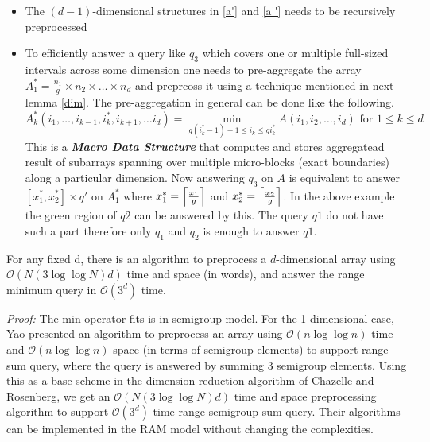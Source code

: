 \begin{itemize}
\item The $(d-1)$-dimensional structures in \eqref{a'} and \eqref{a''} needs to be recursively preprocessed
\item To efficiently answer a query like $q_3$ which covers one or multiple full-sized intervals across some dimension one needs to pre-aggregate the array $A^*_1=\frac{n_1}{g}\times n_2\times\ldots\times n_d$ and preprcoss it using a technique mentioned in next lemma \ref{dim}. The pre-aggregation in general can be done like the following.
\[A^*_k(i_1,\dots,i_{k-1},i^*_k,i_{k+1},\ldots i_d)=\min_{g(i^*_k-1)+1\leq i_k\leq gi^*_k}A(i_1,i_2,\dots,i_d) \text{ for } 1\leq k\leq d\]
This is a \emph{\bf Macro Data Structure} that computes and stores aggregatead result of subarrays spanning over multiple micro-blocks (exact boundaries) along a particular dimension. Now answering $q_3$ on $A$ is equivalent to answer $[x^*_1,x^*_2]\times q'$ on $A^*_1$ where $x^*_1=\ceil*{\frac{x_1}{g}}$ and $x^*_2=\ceil*{\frac{x_2}{g}}$. In the above example the green region of $q2$ can be answered by this. The query $q1$ do not have such a part therefore only $q_1$ and $q_2$ is enough to answer $q1$.
\end{itemize}
\begin{lemma}
\label{dim}
For any fixed d, there is an algorithm to preprocess a $d$-dimensional array using $\mathcal{O}(N(3\log\log N)d)$ time and space (in words), and answer the range minimum query in $\mathcal{O}(3^d)$ time.
\end{lemma}
\emph{Proof:} The min operator fits is in semigroup model. For the 1-dimensional case, Yao \cite{p17} presented an algorithm to preprocess an array using $\mathcal{O}(n\log\log n)$ time and $\mathcal{O}(n\log\log n)$ space (in terms of semigroup elements) to support range sum query, where the query is answered by summing $3$ semigroup elements. Using this as a base scheme in the dimension reduction algorithm of Chazelle and Rosenberg\cite{p3}, we get an $\mathcal{O}(N(3\log\log N)d)$ time and space preprocessing algorithm to support $\mathcal{O}(3^d)$-time range semigroup sum query. Their algorithms can be implemented in the RAM model without changing the complexities.